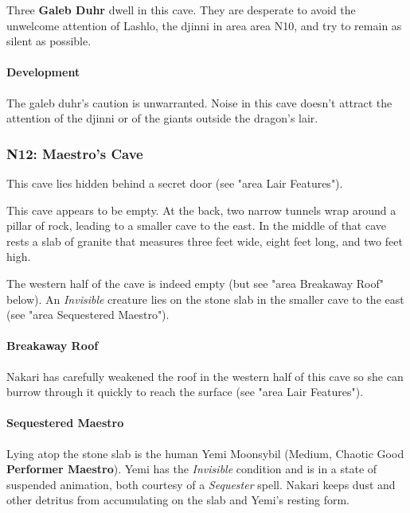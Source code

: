 \documentclass[letterpaper, 11pt, twocolumn]{dndbook}
\begin{document}
Three \textbf{Galeb Duhr} dwell in this cave. They are desperate to avoid the unwelcome attention of Lashlo, the djinni in area area N10, and try to remain as silent as possible.

\paragraph{Development}

The galeb duhr's caution is unwarranted. Noise in this cave doesn't attract the attention of the djinni or of the giants outside the dragon's lair.

\subsubsection{N12: Maestro's Cave}

This cave lies hidden behind a secret door (see "area Lair Features").

\begin{DndReadAloud}
This cave appears to be empty. At the back, two narrow tunnels wrap around a pillar of rock, leading to a smaller cave to the east. In the middle of that cave rests a slab of granite that measures three feet wide, eight feet long, and two feet high.
\end{DndReadAloud}

The western half of the cave is indeed empty (but see "area Breakaway Roof" below). An \textit{Invisible} creature lies on the stone slab in the smaller cave to the east (see "area Sequestered Maestro").

\paragraph{Breakaway Roof}

Nakari has carefully weakened the roof in the western half of this cave so she can burrow through it quickly to reach the surface (see "area Lair Features").

\paragraph{Sequestered Maestro}

Lying atop the stone slab is the human Yemi Moonsybil (Medium, Chaotic Good \textbf{Performer Maestro}). Yemi has the \textit{Invisible} condition and is in a state of suspended animation, both courtesy of a \textit{Sequester} spell. Nakari keeps dust and other detritus from accumulating on the slab and Yemi's resting form.
\end{document}
